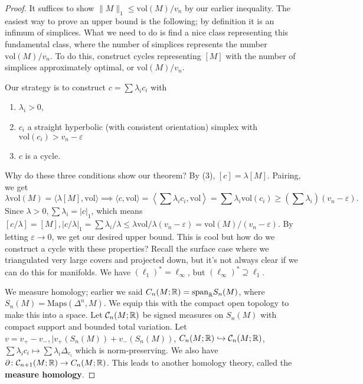 \begin{proof}
    It suffices to show $\|M\|_1 \leq \mathrm{vol}(M) / v_n $ by our earlier inequality. The easiest way to prove an upper bound is the following; by definition it is an infimum of simplices. What we need to do is find a nice class representing this fundamental class, where the number of simplices represents the number $\mathrm{vol}(M) / v_n $. To do this, construct cycles representing $[M]$ with the number of simplices approximately optimal, or $\mathrm{vol}(M) / v_n $.

    Our strategy is to construct $c= \sum \lambda_i  c_i $ with 
    \begin{enumerate}[label=(\arabic*)]
    \setlength\itemsep{-.2em}
        \item $\lambda_i >0$,
        \item $c_i $ a straight hyperbolic (with consistent orientation) simplex with $\mathrm{vol}(c_i ) > v_n -\varepsilon $
        \item $c$ is a cycle.
    \end{enumerate}
    Why do these three conditions show our theorem? By (3), $[c]=\lambda[M]$. Pairing, we get 
    \[
        \lambda \mathrm{vol}(M) = \langle \lambda[M], \mathrm{vol} \rangle \implies \langle c, \mathrm{vol} \rangle = \left\langle \sum \lambda_i  c_i , \mathrm{vol} \right\rangle = \sum \lambda_i \mathrm{vol}(c_i ) \geq \left( \sum \lambda_i  \right) (v_n -\varepsilon ).
    \] Since $\lambda>0,\sum \lambda_i  = |c|_1$, which means $[c /\lambda]=[M], |c / \lambda|_1 = \sum \lambda_i  / \lambda \leq \lambda \mathrm{vol} / \lambda (v_n -\varepsilon )= \mathrm{vol}(M) /(v_n -\varepsilon )$. By letting $\varepsilon  \to 0$, we get our desired upper bound. This is cool but how do we construct a cycle with these properties? Recall the surface case where we triangulated very large covers and projected down, but it's not always clear if we can do this for manifolds. We have $\left( \ell_1 \right) ^*=  \ell _{\infty}$, but $(\ell _{\infty})^* \supseteq \ell_1$. 

    We measure homology; earlier we said $C_n (M;\mathbb{R})= \mathrm{span}_{\mathbb{R}}S_n (M)$, where $S_n (M)= \mathrm{Maps}(\Delta ^n ,M)$. We equip this with the compact open topology to make this into a space. Let $\mathcal{C} _n (M;\mathbb{R})$ be signed measures on $S_n (M)$ with compact support and bounded total variation. Let $v=v_+-v_-,|v_+(S_n (M))+v_-(S_n (M))$, $C_n (M;\mathbb{R}) \hookrightarrow \mathcal{C} _n (M;\mathbb{R})$, $\sum\lambda_i  c_i  \mapsto \sum \lambda_i  \Delta _{c_i }$ which is norm-preserving. We also have $\partial  \colon \mathcal{C} _{n+1}(M;\mathbb{R}) \to C_n (M;\mathbb{R})$. This leads to another homology theory, called the \textbf{measure homology}.
\end{proof}
